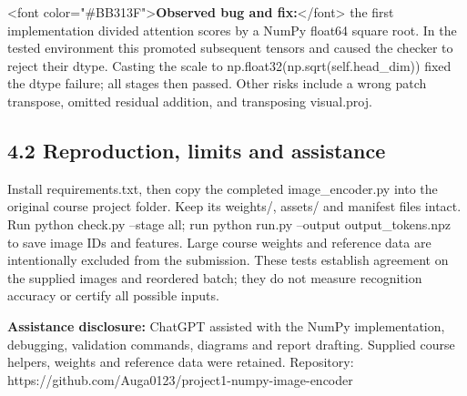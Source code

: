 \documentclass[a4paper,11pt]{article}
\begin{document}
<font color="\#BB313F">\textbf{Observed bug and fix:}</font> the first implementation divided attention scores by a NumPy float64 square root. In the tested environment this promoted subsequent tensors and caused the checker to reject their dtype. Casting the scale to np.float32(np.sqrt(self.head\_dim)) fixed the dtype failure; all stages then passed. Other risks include a wrong patch transpose, omitted residual addition, and transposing visual.proj.

\subsection*{4.2 Reproduction, limits and assistance}
Install requirements.txt, then copy the completed image\_encoder.py into the original course project folder. Keep its weights/, assets/ and manifest files intact. Run python check.py --stage all; run python run.py --output output\_tokens.npz to save image IDs and features. Large course weights and reference data are intentionally excluded from the submission. These tests establish agreement on the supplied images and reordered batch; they do not measure recognition accuracy or certify all possible inputs.

\textbf{Assistance disclosure:} ChatGPT assisted with the NumPy implementation, debugging, validation commands, diagrams and report drafting. Supplied course helpers, weights and reference data were retained. Repository: https://github.com/Auga0123/project1-numpy-image-encoder
\end{document}
